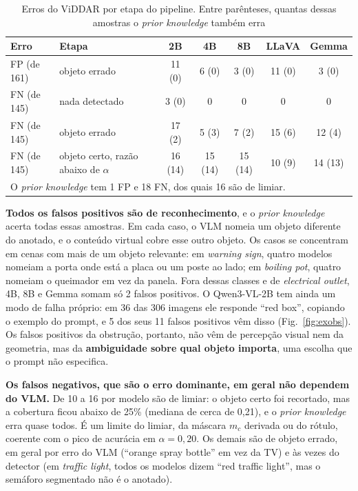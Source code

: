 \documentclass[journal,onecolumn]{IEEEtran}
\begin{document}
\begin{table}[!t]
\renewcommand{\arraystretch}{1.15}
\caption{Erros do ViDDAR por etapa do pipeline. Entre parênteses, quantas dessas amostras o \emph{prior
knowledge} também erra}
\label{tab:etapas}
\centering
\footnotesize
\begin{tabular}{llccccc}
\toprule
Erro & Etapa & 2B & 4B & 8B & LLaVA & Gemma \\
\midrule
FP (de 161) & objeto errado & 11 (0) & 6 (0) & 3 (0) & 11 (0) & 3 (0) \\
FN (de 145) & nada detectado & 3 (0) & 0 & 0 & 0 & 0 \\
FN (de 145) & objeto errado & 17 (2) & 5 (3) & 7 (2) & 15 (6) & 12 (4) \\
FN (de 145) & objeto certo, razão abaixo de $\alpha$ & 16 (14) & 15 (14) & 15 (14) & 10 (9) & 14 (13) \\
\bottomrule
\multicolumn{7}{l}{O \emph{prior knowledge} tem 1 FP e 18 FN, dos quais 16 são de limiar.}
\end{tabular}
\end{table}

\textbf{Todos os falsos positivos são de reconhecimento}, e o \emph{prior knowledge} acerta todas essas
amostras. Em cada caso, o VLM nomeia um objeto diferente do anotado, e o conteúdo virtual cobre esse
outro objeto. Os casos se concentram em cenas com mais de um objeto relevante: em \emph{warning sign},
quatro modelos nomeiam a porta onde está a placa ou um poste ao lado; em \emph{boiling pot}, quatro
nomeiam o queimador em vez da panela. Fora dessas classes e de \emph{electrical outlet}, 4B, 8B e Gemma
somam só 2 falsos positivos. O Qwen3-VL-2B tem ainda um modo de falha próprio: em 36 das 306 imagens ele
responde ``red box'', copiando o exemplo do prompt, e 5 dos seus 11 falsos positivos vêm disso
(Fig.~\ref{fig:exobs}). Os falsos positivos da obstrução, portanto, não vêm de percepção visual nem da
geometria, mas da \textbf{ambiguidade sobre qual objeto importa}, uma escolha que o prompt não
especifica.

\textbf{Os falsos negativos, que são o erro dominante, em geral não dependem do VLM.} De 10 a 16 por
modelo são de limiar: o objeto certo foi recortado, mas a cobertura ficou abaixo de 25\% (mediana de
cerca de 0,21), e o \emph{prior knowledge} erra quase todos. É um limite do limiar, da máscara $m_c$
derivada ou do rótulo, coerente com o pico de acurácia em $\alpha=0{,}20$. Os demais são de objeto
errado, em geral por erro do VLM (``orange spray bottle'' em vez da TV) e às vezes do detector (em
\emph{traffic light}, todos os modelos dizem ``red traffic light'', mas o semáforo segmentado não é o
anotado).
\end{document}
